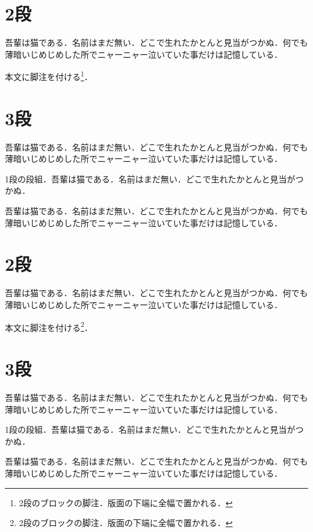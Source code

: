 \documentclass[twocolumn,paper=a6,fontsize=8pt]{jlreq}
\newcommand\para{吾輩は猫である．名前はまだ無い．どこで生れたかとんと見当がつかぬ．何でも薄暗いじめじめした所でニャーニャー泣いていた事だけは記憶している．\par}
\begin{document}
\section{2段}
\para
本文に脚注を付ける\footnote{2段のブロックの脚注．版面の下端に全幅で置かれる．}．
\section{3段}
\para
{}
1段の段組．吾輩は猫である．名前はまだ無い．どこで生れたかとんと見当がつかぬ．\par
{}
\para
\evenendclearpage
\setcounter{section}{0}\setcounter{footnote}{0}
\section{2段}
\para
本文に脚注を付ける\footnote{2段のブロックの脚注．版面の下端に全幅で置かれる．}．
\section{3段}
\para
{}
1段の段組．吾輩は猫である．名前はまだ無い．どこで生れたかとんと見当がつかぬ．\par
{}
\para
\end{document}
